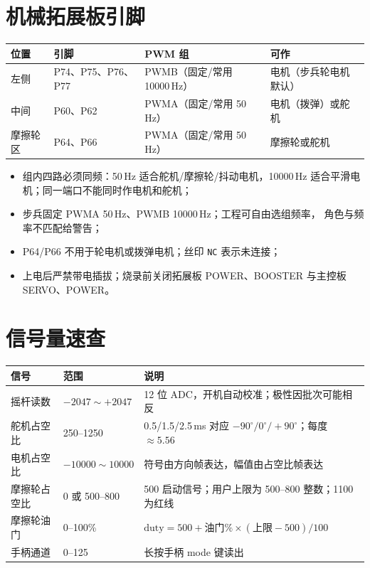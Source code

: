 \section{机械拓展板引脚}

\begin{center}
\begin{tabular}{@{}llll@{}}
\toprule
位置 & 引脚 & PWM 组 & 可作 \\
\midrule
左侧 & P74、P75、P76、P77 & PWMB（固定/常用 10000\,Hz） & 电机（步兵轮电机默认） \\
中间 & P60、P62 & PWMA（固定/常用 50\,Hz） & 电机（拨弹）或舵机 \\
摩擦轮区 & P64、P66 & PWMA（固定/常用 50\,Hz） & 摩擦轮或舵机 \\
\bottomrule
\end{tabular}
\end{center}

\begin{itemize}
  \item 组内四路必须同频：50\,Hz 适合舵机/摩擦轮/抖动电机，10000\,Hz
        适合平滑电机；同一端口不能同时作电机和舵机；
  \item 步兵固定 PWMA 50\,Hz、PWMB 10000\,Hz；工程可自由选组频率，
        角色与频率不匹配给警告；
  \item P64/P66 不用于轮电机或拨弹电机；丝印 \texttt{NC} 表示未连接；
  \item 上电后严禁带电插拔；烧录前关闭拓展板 POWER、BOOSTER 与主控板
        SERVO、POWER。
\end{itemize}

\section{信号量速查}

\begin{center}
\begin{tabular}{@{}lll@{}}
\toprule
信号 & 范围 & 说明 \\
\midrule
摇杆读数 & $-2047 \sim +2047$ & 12 位 ADC，开机自动校准；极性因批次可能相反 \\
舵机占空比 & 250--1250 & 0.5/1.5/2.5\,ms 对应 $-90^\circ/0^\circ/+90^\circ$；每度 $\approx5.56$ \\
电机占空比 & $-10000 \sim 10000$ & 符号由方向帧表达，幅值由占空比帧表达 \\
摩擦轮占空比 & 0 或 500--800 & 500 启动信号；用户上限为 500--800 整数；1100 为红线 \\
摩擦轮油门 & 0--100\% & $\text{duty} = 500 + \text{油门}\% \times (\text{上限} - 500)/100$ \\
手柄通道 & 0--125 & 长按手柄 mode 键读出 \\
\bottomrule
\end{tabular}
\end{center}

